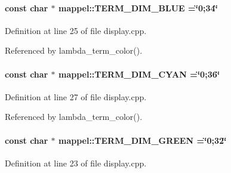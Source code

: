\paragraph[{\texorpdfstring{T\+E\+R\+M\+\_\+\+D\+I\+M\+\_\+\+B\+L\+UE}{TERM_DIM_BLUE}}]{\setlength{\rightskip}{0pt plus 5cm}const char $\ast$ mappel\+::\+T\+E\+R\+M\+\_\+\+D\+I\+M\+\_\+\+B\+L\+UE =\char`\"{}0;34\char`\"{}}\hypertarget{namespacemappel_a81976972f9e20d3f3ec3e541302bf465}{}\label{namespacemappel_a81976972f9e20d3f3ec3e541302bf465}


Definition at line 25 of file display.\+cpp.



Referenced by lambda\+\_\+term\+\_\+color().

\paragraph[{\texorpdfstring{T\+E\+R\+M\+\_\+\+D\+I\+M\+\_\+\+C\+Y\+AN}{TERM_DIM_CYAN}}]{\setlength{\rightskip}{0pt plus 5cm}const char $\ast$ mappel\+::\+T\+E\+R\+M\+\_\+\+D\+I\+M\+\_\+\+C\+Y\+AN =\char`\"{}0;36\char`\"{}}\hypertarget{namespacemappel_ad168ab0229814251071c6680e9792b0f}{}\label{namespacemappel_ad168ab0229814251071c6680e9792b0f}


Definition at line 27 of file display.\+cpp.



Referenced by lambda\+\_\+term\+\_\+color().

\paragraph[{\texorpdfstring{T\+E\+R\+M\+\_\+\+D\+I\+M\+\_\+\+G\+R\+E\+EN}{TERM_DIM_GREEN}}]{\setlength{\rightskip}{0pt plus 5cm}const char $\ast$ mappel\+::\+T\+E\+R\+M\+\_\+\+D\+I\+M\+\_\+\+G\+R\+E\+EN =\char`\"{}0;32\char`\"{}}\hypertarget{namespacemappel_af35fa592f92c75d4190e1b5aff9fbcfe}{}\label{namespacemappel_af35fa592f92c75d4190e1b5aff9fbcfe}


Definition at line 23 of file display.\+cpp.




